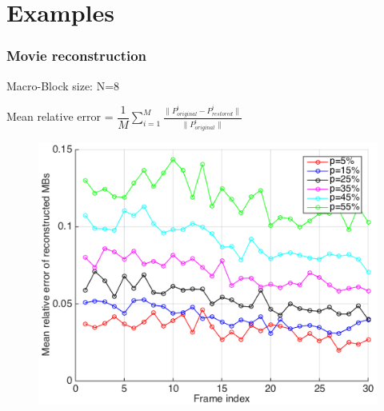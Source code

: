 \documentclass{beamer}
\begin{document}
\section{Examples}

\begin{frame}
\frametitle{Movie reconstruction}
Macro-Block size: N=8
\begin{center}
\end{center}
\end{frame}

\begin{frame}
Mean relative error = $\dfrac{1}{M}\sum_{i=1}^{M}\frac{\| P^i_{original}-P^i_{restored} \|}{\|P^i_{original} \|}$
\begin{figure}
\includegraphics[width=0.65\linewidth]{pEffectPlotNew}
\end{figure}
\end{frame}
\end{document}
